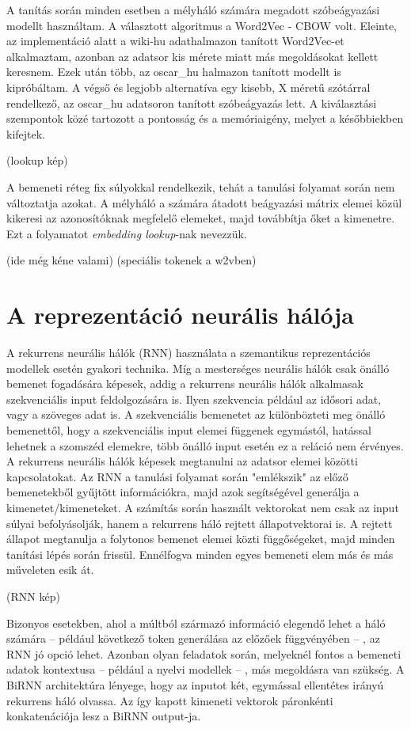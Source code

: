 A tanítás során minden esetben a mélyháló számára megadott szóbeágyazási modellt használtam. A választott algoritmus a Word2Vec - CBOW volt. Eleinte, az implementáció alatt a wiki-hu adathalmazon tanított Word2Vec-et alkalmaztam, azonban az adatsor kis mérete miatt más megoldásokat kellett keresnem.  Ezek után több, az oscar\_hu halmazon tanított modellt is kipróbáltam. A végső és legjobb alternatíva egy kisebb, X méretű szótárral rendelkező, az oscar\_hu adatsoron tanított szóbeágyazás lett. A kiválasztási szempontok közé tartozott a pontosság és a memóriaigény, melyet a későbbiekben kifejtek.

(lookup kép)

A bemeneti réteg fix súlyokkal rendelkezik, tehát a tanulási folyamat során nem változtatja azokat. A mélyháló a számára átadott beágyazási mátrix elemei közül kikeresi az azonosítóknak megfelelő elemeket, majd továbbítja őket a kimenetre. Ezt a folyamatot \textit{embedding lookup}-nak nevezzük.

(ide még kéne valami)
(speciális tokenek a w2vben)

\section{A reprezentáció neurális hálója}

A rekurrens neurális hálók (RNN) használata a szemantikus reprezentációs modellek esetén gyakori technika. Míg a mesterséges neurális hálók csak önálló bemenet fogadására képesek, addig a rekurrens neurális hálók alkalmasak szekvenciális input feldolgozására is. Ilyen szekvencia például az idősori adat, vagy a szöveges adat is. A szekvenciális bemenetet az különbözteti meg önálló bemenettől, hogy a szekvenciális input elemei függenek egymástól, hatással lehetnek a szomszéd elemekre, több önálló input esetén ez a reláció nem érvényes.
A rekurrens neurális hálók képesek megtanulni az adatsor elemei közötti kapcsolatokat. Az RNN a tanulási folyamat során "emlékszik" az előző bemenetekből gyűjtött információkra, majd azok segítségével generálja a kimenetet/kimeneteket. A számítás során használt vektorokat nem csak az input súlyai befolyásolják, hanem a rekurrens háló rejtett állapotvektorai is. A rejtett állapot megtanulja a folytonos bemenet elemei közti függőségeket, majd minden tanítási lépés során frissül. Ennélfogva minden egyes bemeneti elem más és más műveleten esik át.

(RNN kép)

Bizonyos esetekben, ahol a múltból származó információ elegendő lehet a háló számára – például következő token generálása az előzőek függvényében – , az RNN jó opció lehet. Azonban olyan feladatok során, melyeknél fontos a bemeneti adatok kontextusa – például a nyelvi modellek – , más megoldásra van szükség. A BiRNN architektúra lényege, hogy az inputot két, egymással ellentétes irányú rekurrens háló olvassa. Az így kapott kimeneti vektorok páronkénti konkatenációja lesz a BiRNN output-ja.

